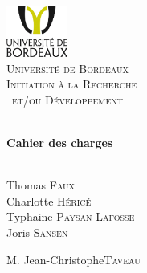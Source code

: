 %

\begin{titlepage}

\begin{center}


\includegraphics[width=0.15\textwidth]{logounibdx.png}\\[1cm]    

\textsc{\LARGE Université de Bordeaux}\\[1.5cm]
\vspace*{0.5cm}
\textsc{\Large Initiation à la Recherche\\\ et/ou Développement}\\[0.5cm]

\vspace*{1cm}

\HRule \\[0.4cm]
{ \huge \bfseries Cahier des charges}\\[0.4cm]

\HRule \\[1.5cm]
\begin{minipage}{0.4\textwidth}
\begin{center} \large
Thomas \textsc{Faux}\\
Charlotte \textsc{Héricé}\\
Typhaine \textsc{Paysan-Lafosse}\\
Joris \textsc{Sansen}\\
\end{center}
\end{minipage}
\begin{minipage}{0.4\textwidth}
\begin{flushright} \large
M. Jean-Christophe\textsc{Taveau}
\end{flushright}
\end{minipage}


\end{center}
\end{titlepage}
